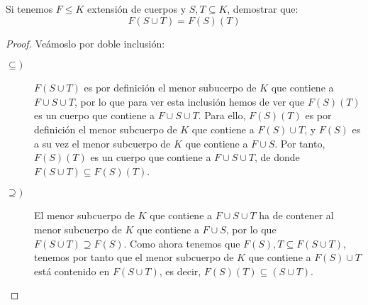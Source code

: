 \begin{ejercicio}
    Si tenemos $F\leq K$ extensión de cuerpos y $S,T\subseteq K$, demostrar que:
    \begin{equation*}
        F(S\cup T) = F(S)(T)
    \end{equation*}
    \begin{proof}
        Veámoslo por doble inclusión:
        \begin{description}
            \item [$\subseteq )$] $F(S\cup T)$ es por definición el menor subucerpo de $K$ que contiene a $F\cup S\cup T$, por lo que para ver esta inclusión hemos de ver que $F(S)(T)$ es un cuerpo que contiene a $F\cup S\cup T$. Para ello, $F(S)(T)$ es por definición el menor subcuerpo de $K$ que contiene a $F(S)\cup T$, y $F(S)$ es a su vez el menor subcuerpo de $K$ que contiene a $F\cup S$. Por tanto, $F(S)(T)$ es un cuerpo que contiene a $F\cup S\cup T$, de donde $F(S\cup T)\subseteq F(S)(T)$.
            \item [$\supseteq )$] El menor subcuerpo de $K$ que contiene a $F\cup S\cup T$ ha de contener al menor subcuerpo de $K$ que contiene a $F\cup S$, por lo que $F(S\cup T)\supseteq F(S)$. Como ahora tenemos que $F(S),T\subseteq F(S\cup T)$, tenemos por tanto que el menor subcuerpo de $K$ que contiene a $F(S)\cup T$ está contenido en $F(S\cup T)$, es decir, $F(S)(T)\subseteq (S\cup T)$.
        \end{description}
    \end{proof}
\end{ejercicio}

